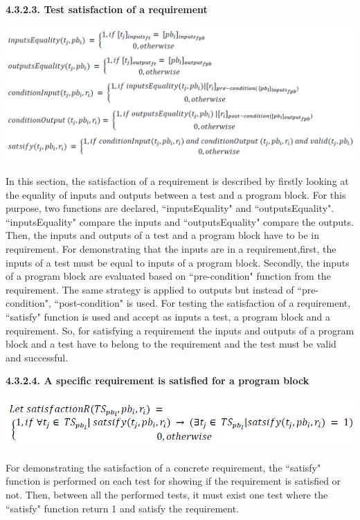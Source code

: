 \documentclass[conference,compsoc]{IEEEtran}
\begin{document}
\noindent
\newpage
\textbf{4.3.2.3. Test satisfaction of a requirement}
\begin{center}
\includegraphics[scale=0.35]{Proof2-Part3.png} 
\end{center}

In this section, the satisfaction of a requirement is described by firstly looking at the equality of inputs and outputs between a test and a program block. For this purpose, two functions are declared, ``inputsEquality" and ``outputsEquality". ``inputsEquality" compare the inputs and ``outputsEquality" compare the outputs. 
\newline
Then, the inputs and outputs of a test and a program block have to be in requirement. For demonstrating that the inputs are in a requirement,first, the inputs of a test must be equal to inputs of a program block. Secondly, the inputs of a program block are evaluated based on ``pre-condition" function from the requirement. The same strategy is applied to outputs but instead of ``pre-condition", ``post-condition" is used. 
\newline
For testing the satisfaction of a requirement, ``satisfy" function is used and accept as inputs a test, a program block and a requirement. So, for satisfying a requirement the inputs and outputs of a program block and a test have to belong to the requirement and the test must be valid and successful. 


\noindent
\newline
\textbf{4.3.2.4. A specific requirement is satisfied for a program block}
\begin{center}
\includegraphics[scale=0.5]{Proof2-Part4.png} 
\end{center}

For demonstrating the satisfaction of a concrete requirement, the ``satisfy" function is performed on each test for showing if the requirement is satisfied or not. Then, between all the performed tests, it must exist one test where the ``satisfy" function return 1 and satisfy the requirement. 
\end{document}
